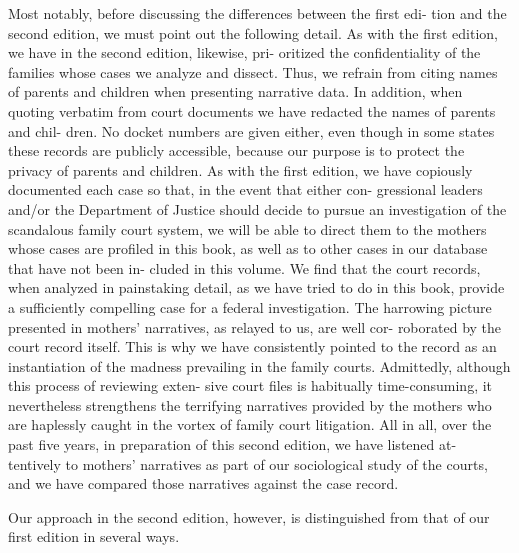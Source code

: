 

Most notably, before discussing the differences between the first edi-
tion and the second edition, we must point out the following detail.
As with the first edition, we have in the second edition, likewise, pri-
oritized the confidentiality of the families whose cases we analyze and
dissect. Thus, we refrain from citing names of parents and children
when presenting narrative data. In addition, when quoting verbatim
from court documents we have redacted the names of parents and chil-
dren. No docket numbers are given either, even though in some states
these records are publicly accessible, because our purpose is to protect
the privacy of parents and children. As with the first edition, we have
copiously documented each case so that, in the event that either con-
gressional leaders and/or the Department of Justice should decide to
pursue an investigation of the scandalous family court system, we will
be able to direct them to the mothers whose cases are profiled in this
book, as well as to other cases in our database that have not been in-
cluded in this volume. We find that the court records, when analyzed in
painstaking detail, as we have tried to do in this book, provide a
sufficiently compelling case for a federal investigation. The harrowing
picture presented in mothers’ narratives, as relayed to us, are well cor-
roborated by the court record itself. This is why we have consistently
pointed to the record as an instantiation of the madness prevailing in
the family courts. Admittedly, although this process of reviewing exten-
sive court files is habitually time-consuming, it nevertheless strengthens
the terrifying narratives provided by the mothers who are haplessly
caught in the vortex of family court litigation. All in all, over the past
five years, in preparation of this second edition, we have listened at-
tentively to mothers’ narratives as part of our sociological study of
the courts, and we have compared those narratives against the case
record. \pfl{}


Our approach in the second edition, however, is distinguished from
that of our first edition in several ways. \pfl{}


